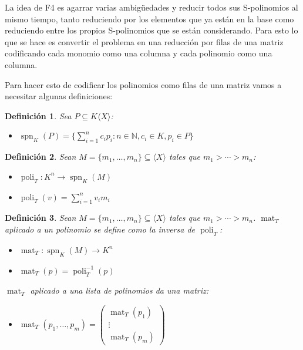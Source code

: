 \documentclass[12pt]{report}
\theoremstyle{customstyle}
\newtheorem{definition}{Definición}[chapter]
\theoremstyle{factstyle}
\DeclareMathOperator{\spn}{spn} %
\DeclareMathOperator{\mat}{mat}
\DeclareMathOperator{\poli}{poli}
\begin{document}
La idea de F4 es agarrar varias ambigüedades y reducir todos sus S-polinomios al mismo tiempo, tanto reduciendo por los elementos que ya están en la base como reduciendo entre los propios S-polinomios que se están considerando. Para esto lo que se hace es convertir el problema en una reducción por filas de una matriz codificando cada monomio como una columna y cada polinomio como una columna.

Para hacer esto de codificar los polinomios como filas de una matriz vamos a necesitar algunas definiciones:

\begin{definition}
Sea $P ⊆ K⟨X⟩$:

\begin{itemize}
  \item $\spn_K(P) = \{∑_{i = 1}^n c_i p_i : n ∈ ℕ, c_i ∈ K, p_i ∈ P\}$
\end{itemize}

\end{definition}

\begin{definition}
Sean $M = \{m_1, …, m_n\} ⊆ ⟨X⟩$ tales que $m_1 > ⋯ > m_n$:

\begin{itemize}
  \item $\poli_T : K^n → \spn_K(M)$
  \item $\poli_T(v) = ∑_{i = 1}^n v_i m_i$
\end{itemize}

\end{definition}

\begin{definition}
Sean $M = \{m_1, …, m_n\} ⊆ ⟨X⟩$ tales que $m_1 > ⋯ > m_n$. $\mat_T$ aplicado a un polinomio se define como la inversa de $\poli_T$:

\begin{itemize}
  \item $\mat_T : \spn_K(M) → K^n$
  \item $\mat_T(p) = \poli_T^{-1}(p)$
\end{itemize}

$\mat_T$ aplicado a una lista de polinomios da una matriz:

\begin{itemize}
  \item $\mat_T(p_1, …, p_m) = \begin{pmatrix} \mat_T(p_1) \\ ⋮ \\ \mat_T(p_m) \end{pmatrix}$
\end{itemize}

\end{definition}
\end{document}
